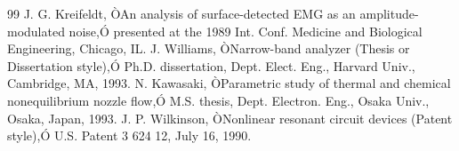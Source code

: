 \documentclass[letterpaper, 10 pt, conference]{ieeeconf}  %
\begin{document}
\begin{thebibliography}{99}
 J. G. Kreifeldt, ÒAn analysis of surface-detected EMG as an amplitude-modulated noise,Ó presented at the 1989 Int. Conf. Medicine and Biological Engineering, Chicago, IL.
 J. Williams, ÒNarrow-band analyzer (Thesis or Dissertation style),Ó Ph.D. dissertation, Dept. Elect. Eng., Harvard Univ., Cambridge, MA, 1993. 
 N. Kawasaki, ÒParametric study of thermal and chemical nonequilibrium nozzle flow,Ó M.S. thesis, Dept. Electron. Eng., Osaka Univ., Osaka, Japan, 1993.
 J. P. Wilkinson, ÒNonlinear resonant circuit devices (Patent style),Ó U.S. Patent 3 624 12, July 16, 1990. 






\end{thebibliography}
\end{document}
